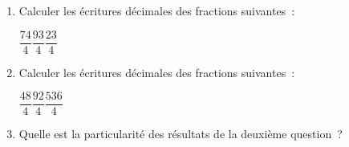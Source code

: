 \documentclass[activite]{thedocument}
\begin{document}
    \begin{enumerate}
        \item Calculer les écritures décimales des fractions suivantes~:\vskip5pt
        {\centering$\dfrac{74}4$\hskip75pt$\dfrac{93}4$\hskip75pt$\dfrac{23}4$\par}
        \vskip100pt
        \item Calculer les écritures décimales des fractions suivantes~:\vskip5pt
        {\centering$\dfrac{48}4$\hskip75pt$\dfrac{92}4$\hskip75pt$\dfrac{536}4$\par}
        \vskip100pt
        \item Quelle est la particularité des résultats de la deuxième question~?
    \end{enumerate}
\end{document}
